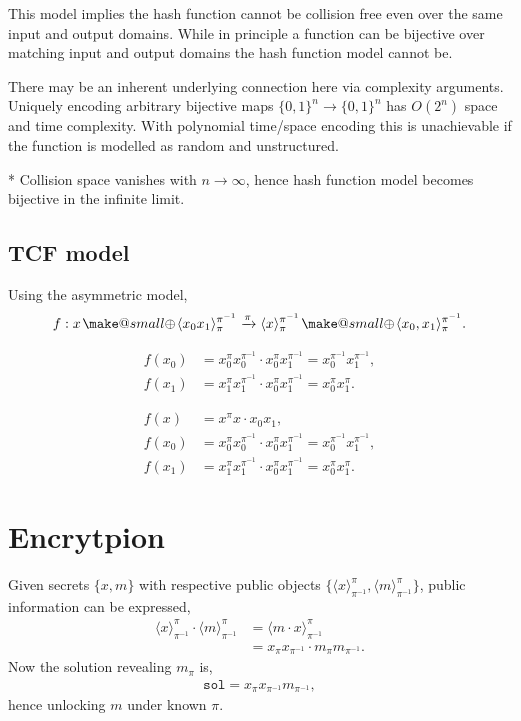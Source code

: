 \documentclass[twocolumn, aps, amsmath, amssymb, nofootinbib, superscriptaddress, longbibliography, doublefloatfix, table-of-contents, eqsecnum, rmp]{revtex4-2}
\makeatletter
\def\braid#1#2#3#4{\langle#1,#2\rangle_{#3}^{#4}}
\def\selfbraid#1#2#3{\langle#1\rangle_{#2}^{#3}}
\newcommand{\soplus}{{{\hspace{1pt}}{\mathbin{\mathpalette\make@small\oplus}}}{\hspace{1pt}}}
\newcommand{\make@small}[2]{%
  \vcenter{\hbox{%
    \scalebox{0.6}{$\m@th#1#2$}%
  }}%
}
\makeatother
\begin{document}
This model implies the hash function cannot be collision free even over the same input and output domains. While in principle a function can be bijective over matching input and output domains the hash function model cannot be.

There may be an inherent underlying connection here via complexity arguments. Uniquely encoding arbitrary bijective maps \mbox{$\{0,1\}^n\to \{0,1\}^n$} has $O(2^n)$ space and time complexity. With polynomial time/space encoding this is unachievable if the function is modelled as random and unstructured.

* Collision space vanishes with $n\to\infty$, hence hash function model becomes bijective in the infinite limit. 

\subsection{TCF model}

Using the asymmetric model,
\begin{align}
	f: x\soplus \selfbraid{x_0 x_1}{\pi}{\pi^{-1}} \xrightarrow{\pi} \selfbraid{x}{\pi}{\pi^{-1}} \soplus \braid{x_0}{x_1}{\pi}{\pi^{-1}}.
\end{align}

\begin{align}
	f(x_0) &= x_0^\pi x_0^{\pi^{-1}} \cdot x_0^\pi x_1^{\pi^{-1}} = x_0^{\pi^{-1}} x_1^{\pi^{-1}},\nonumber\\
	f(x_1) &= x_1^\pi x_1^{\pi^{-1}} \cdot x_0^\pi x_1^{\pi^{-1}} = x_0^{\pi} x_1^{\pi}.
\end{align}

\begin{align}
	f(x) &= x^\pi x \cdot x_0 x_1,\nonumber\\
	f(x_0) &= x_0^\pi x_0^{\pi^{-1}} \cdot x_0^\pi x_1^{\pi^{-1}} = x_0^{\pi^{-1}} x_1^{\pi^{-1}},\nonumber\\
	f(x_1) &= x_1^\pi x_1^{\pi^{-1}} \cdot x_0^\pi x_1^{\pi^{-1}} = x_0^{\pi} x_1^{\pi}.
\end{align}

\section{Encrytpion}

Given secrets $\{x,m\}$ with respective public objects $\{\selfbraid{x}{\pi^{-1}}{\pi},\selfbraid{m}{{\pi}^{-1}}{\pi}\}$, public information can be expressed,
\begin{align}
	\selfbraid{x}{\pi^{-1}}{\pi} \cdot \selfbraid{m}{{\pi}^{-1}}{\pi} &= \selfbraid{m\cdot x}{{\pi}^{-1}}{\pi} \nonumber\\
	&= x_{\pi}x_{\pi^{-1}} \cdot m_\pi m_{\pi^{-1}}.
\end{align}
Now the solution revealing $m_\pi$ is,
\begin{align}
	\mathtt{sol} = x_\pi x_{\pi^{-1}} m_{\pi^{-1}},
\end{align}
hence unlocking $m$ under known $\pi$.
\end{document}
